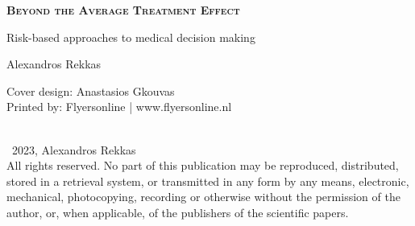 


\clearpage\null\pagestyle{empty}
\newpage


\pagestyle{empty}

\def\drop{.1\textheight}

\vspace*{6cm}
\begin{center}
\Large \textbf{\textsc{Beyond the Average Treatment Effect}}\par
\Large Risk-based approaches to medical decision making \par

\vspace*{1.8cm}

\Large Alexandros Rekkas

\end{center}

\clearpage

\thispagestyle{empty}
\vspace*{12cm}

\begingroup %
\small
\setlength{\parskip}{\baselineskip} %
\setlength\parindent{0pt} %
Cover design: Anastasios Gkouvas \\
Printed by: Flyersonline | www.flyersonline.nl \\
\\
\begin{flushleft}
\textcopyright\ 2023, Alexandros Rekkas \\
All rights reserved. No part of this publication may be reproduced, distributed,
stored in a retrieval system, or transmitted in any form by any means, electronic,
mechanical, photocopying, recording or otherwise without the permission of the
author, or, when applicable, of the publishers of the scientific papers.
\end{flushleft}

\endgroup

\newpage
\thispagestyle{empty}

